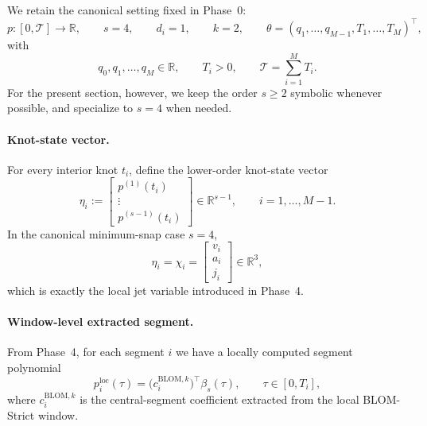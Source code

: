 We retain the canonical setting fixed in Phase~0:
\[
p:[0,\mathcal T]\to\mathbb R,\qquad
s=4,\qquad d_i=1,\qquad k=2,
\qquad
\theta=(q_1,\dots,q_{M-1},T_1,\dots,T_M)^\top,
\]
with
\[
q_0,q_1,\dots,q_M\in\mathbb R,
\qquad
T_i>0,
\qquad
\mathcal T=\sum_{i=1}^{M}T_i.
\]
For the present section, however, we keep the order \(s\ge 2\) symbolic whenever possible, and specialize to \(s=4\) when needed.

\paragraph{Knot-state vector.}
For every interior knot \(t_i\), define the lower-order knot-state vector
\begin{equation}
\label{eq:phase5_eta_i}
\eta_i
:=
\begin{bmatrix}
p^{(1)}(t_i)\\
\vdots\\
p^{(s-1)}(t_i)
\end{bmatrix}
\in \mathbb R^{s-1},
\qquad i=1,\dots,M-1.
\end{equation}
In the canonical minimum-snap case \(s=4\),
\begin{equation}
\label{eq:phase5_eta_i_s4}
\eta_i=
\chi_i=
\begin{bmatrix}
v_i\\ a_i\\ j_i
\end{bmatrix}
\in\mathbb R^3,
\end{equation}
which is exactly the local jet variable introduced in Phase~4.

\paragraph{Window-level extracted segment.}
From Phase~4, for each segment \(i\) we have a locally computed segment polynomial
\[
p_i^{\mathrm{loc}}(\tau)
=
\bigl(c_i^{\mathrm{BLOM},k}\bigr)^\top \beta_s(\tau),
\qquad \tau\in[0,T_i],
\]
where \(c_i^{\mathrm{BLOM},k}\) is the central-segment coefficient extracted from the local BLOM-Strict window.

